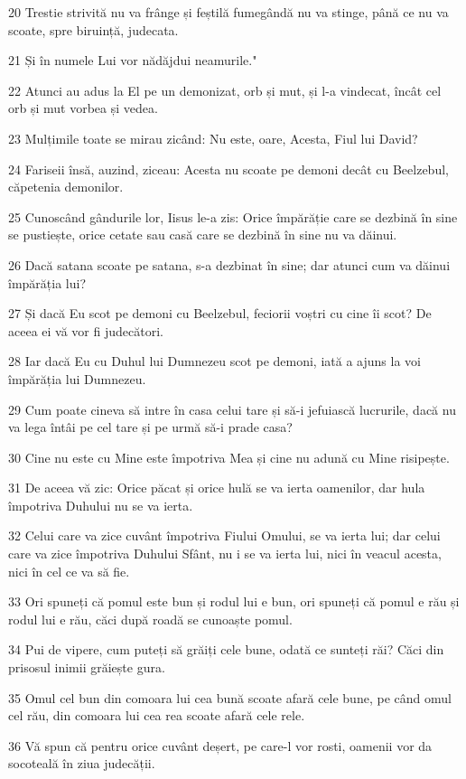\par 20 Trestie strivită nu va frânge și feștilă fumegândă nu va stinge, până ce nu va scoate, spre biruință, judecata.
\par 21 Și în numele Lui vor nădăjdui neamurile."
\par 22 Atunci au adus la El pe un demonizat, orb și mut, și l-a vindecat, încât cel orb și mut vorbea și vedea.
\par 23 Mulțimile toate se mirau zicând: Nu este, oare, Acesta, Fiul lui David?
\par 24 Fariseii însă, auzind, ziceau: Acesta nu scoate pe demoni decât cu Beelzebul, căpetenia demonilor.
\par 25 Cunoscând gândurile lor, Iisus le-a zis: Orice împărăție care se dezbină în sine se pustiește, orice cetate sau casă care se dezbină în sine nu va dăinui.
\par 26 Dacă satana scoate pe satana, s-a dezbinat în sine; dar atunci cum va dăinui împărăția lui?
\par 27 Și dacă Eu scot pe demoni cu Beelzebul, feciorii voștri cu cine îi scot? De aceea ei vă vor fi judecători.
\par 28 Iar dacă Eu cu Duhul lui Dumnezeu scot pe demoni, iată a ajuns la voi împărăția lui Dumnezeu.
\par 29 Cum poate cineva să intre în casa celui tare și să-i jefuiască lucrurile, dacă nu va lega întâi pe cel tare și pe urmă să-i prade casa?
\par 30 Cine nu este cu Mine este împotriva Mea și cine nu adună cu Mine risipește.
\par 31 De aceea vă zic: Orice păcat și orice hulă se va ierta oamenilor, dar hula împotriva Duhului nu se va ierta.
\par 32 Celui care va zice cuvânt împotriva Fiului Omului, se va ierta lui; dar celui care va zice împotriva Duhului Sfânt, nu i se va ierta lui, nici în veacul acesta, nici în cel ce va să fie.
\par 33 Ori spuneți că pomul este bun și rodul lui e bun, ori spuneți că pomul e rău și rodul lui e rău, căci după roadă se cunoaște pomul.
\par 34 Pui de vipere, cum puteți să grăiți cele bune, odată ce sunteți răi? Căci din prisosul inimii grăiește gura.
\par 35 Omul cel bun din comoara lui cea bună scoate afară cele bune, pe când omul cel rău, din comoara lui cea rea scoate afară cele rele.
\par 36 Vă spun că pentru orice cuvânt deșert, pe care-l vor rosti, oamenii vor da socoteală în ziua judecății.
